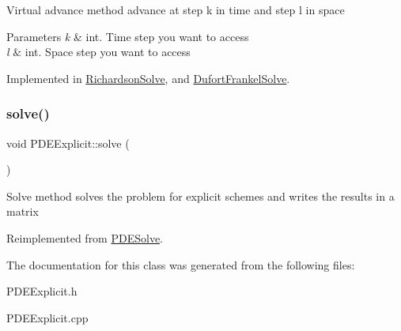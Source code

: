 Virtual advance method advance at step k in time and step l in space 
\begin{DoxyParams}{Parameters}
{\em k} & int. Time step you want to access \\
\hline
{\em l} & int. Space step you want to access \\
\hline
\end{DoxyParams}


Implemented in \hyperlink{class_richardson_solve_adaedf7448ffb94b08690ce6e878ab33c}{Richardson\+Solve}, and \hyperlink{class_dufort_frankel_solve_ab89cf099385aa161de262fbe4db284d8}{Dufort\+Frankel\+Solve}.

\mbox{\label{class_p_d_e_explicit_a78282717c8230e9be65599865865e0c7}} 
\subsubsection{\texorpdfstring{solve()}{solve()}}
{\footnotesize\ttfamily void P\+D\+E\+Explicit\+::solve (\begin{DoxyParamCaption}{ }\end{DoxyParamCaption})\hspace{0.3cm}{\ttfamily [virtual]}}

Solve method solves the problem for explicit schemes and writes the results in a matrix 

Reimplemented from \hyperlink{class_p_d_e_solve_a2fb309c3e7f35de2f639596f7fcb17cc}{P\+D\+E\+Solve}.



The documentation for this class was generated from the following files\+:\begin{DoxyCompactItemize}
\item 
P\+D\+E\+Explicit.\+h\item 
P\+D\+E\+Explicit.\+cpp\end{DoxyCompactItemize}
